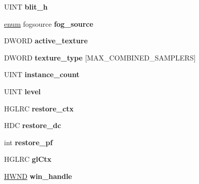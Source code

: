 \begin{DoxyCompactItemize}
U\+I\+NT {\bfseries blit\+\_\+h}
\item 
\mbox{\label{structwined3d__context_a559d5a696a9e912a380d01a3cd909efe}} 
\hyperlink{interfaceenum}{enum} fogsource {\bfseries fog\+\_\+source}
\item 
\mbox{\label{structwined3d__context_a46420e861a8d17a6da983abd8e7aec16}} 
D\+W\+O\+RD {\bfseries active\+\_\+texture}
\item 
\mbox{\label{structwined3d__context_ac819fccc7ca922458087947b803ddd20}} 
D\+W\+O\+RD {\bfseries texture\+\_\+type} \mbox{[}M\+A\+X\+\_\+\+C\+O\+M\+B\+I\+N\+E\+D\+\_\+\+S\+A\+M\+P\+L\+E\+RS\mbox{]}
\item 
\mbox{\label{structwined3d__context_a2b3dafe3241c3165b404ed37f2b50778}} 
U\+I\+NT {\bfseries instance\+\_\+count}
\item 
\mbox{\label{structwined3d__context_a5f3871574402a65ed4e5cfc8321010cf}} 
U\+I\+NT {\bfseries level}
\item 
\mbox{\label{structwined3d__context_aab9e6b81c1b6f0da59f5c72425365970}} 
H\+G\+L\+RC {\bfseries restore\+\_\+ctx}
\item 
\mbox{\label{structwined3d__context_a084b291bc4c522e9c198a00b34cb731e}} 
H\+DC {\bfseries restore\+\_\+dc}
\item 
\mbox{\label{structwined3d__context_abbe6fdd41eecab5e9cc8cbe8e3b16d44}} 
int {\bfseries restore\+\_\+pf}
\item 
\mbox{\label{structwined3d__context_a221069d579758aa532c1080858f0fc62}} 
H\+G\+L\+RC {\bfseries gl\+Ctx}
\item 
\mbox{\label{structwined3d__context_ad83e344eb5e3237ea5cdb7d7fd370a4f}} 
\hyperlink{interfacevoid}{H\+W\+ND} {\bfseries win\+\_\+handle}
\item 
\mbox{\label{structwined3d__context_a04b5c7835b3d9613f4a96f449b850603}} 

\end{DoxyCompactItemize}
